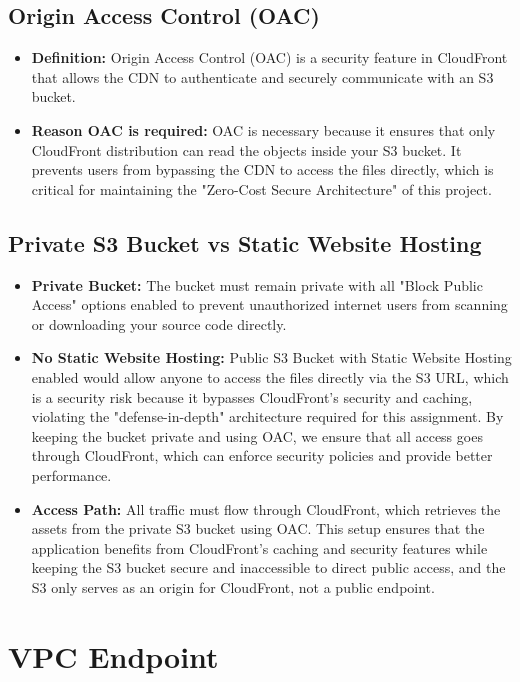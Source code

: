 \subsection{Origin Access Control (OAC)}
\begin{itemize}
  \item \textbf{Definition:} Origin Access Control (OAC) is a security feature in CloudFront that allows the CDN to authenticate and securely communicate with an S3 bucket.
  \item \textbf{Reason OAC is required:}  OAC is necessary because it ensures that only CloudFront distribution can read the objects inside your S3 bucket. It prevents users from bypassing the CDN to access the files directly, which is critical for maintaining the "Zero-Cost Secure Architecture" of this project.
\end{itemize}

\subsection{Private S3 Bucket vs Static Website Hosting}
\begin{itemize}
  \item \textbf{Private Bucket:} The bucket must remain private with all "Block Public Access" options enabled to prevent unauthorized internet users from scanning or downloading your source code directly.
  \item \textbf{No Static Website Hosting:} Public S3 Bucket with Static Website Hosting enabled would allow anyone to access the files directly via the S3 URL, which is a security risk because it bypasses CloudFront's security and caching, violating the "defense-in-depth" architecture required for this assignment. By keeping the bucket private and using OAC, we ensure that all access goes through CloudFront, which can enforce security policies and provide better performance.
  \item \textbf{Access Path:} All traffic must flow through CloudFront, which retrieves the assets from the private S3 bucket using OAC. This setup ensures that the application benefits from CloudFront's caching and security features while keeping the S3 bucket secure and inaccessible to direct public access, and the S3 only serves as an origin for CloudFront, not a public endpoint.
\end{itemize}

\section{VPC Endpoint}
